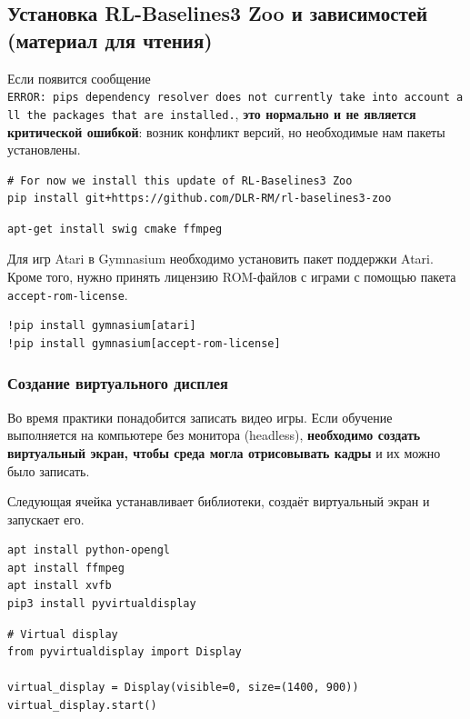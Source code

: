 \documentclass[11pt,a4paper]{article}
\begin{document}
\subsection{Установка RL-Baselines3 Zoo и зависимостей (материал для чтения)}\label{install-rl-baselines3-zoo-and-its-dependencies-reading}

Если появится сообщение \texttt{ERROR:\ pip\textquotesingle{}s\ dependency\ resolver\ does\ not\ currently\ take\ into\ account\ all\ the\ packages\ that\ are\ installed.}, \textbf{это нормально и не является критической ошибкой}: возник конфликт версий, но необходимые нам пакеты установлены.

\begin{lstlisting}
# For now we install this update of RL-Baselines3 Zoo
pip install git+https://github.com/DLR-RM/rl-baselines3-zoo
\end{lstlisting}

\begin{lstlisting}
apt-get install swig cmake ffmpeg
\end{lstlisting}

Для игр Atari в Gymnasium необходимо установить пакет поддержки Atari. Кроме того, нужно принять лицензию ROM-файлов с играми с помощью пакета \texttt{accept-rom-license}.

\begin{lstlisting}
!pip install gymnasium[atari]
!pip install gymnasium[accept-rom-license]
\end{lstlisting}

\subsubsection{Создание виртуального дисплея}\label{create-a-virtual-display}

Во время практики понадобится записать видео игры. Если обучение выполняется на компьютере без монитора (headless), \textbf{необходимо создать виртуальный экран, чтобы среда могла отрисовывать кадры} и их можно было записать.

Следующая ячейка устанавливает библиотеки, создаёт виртуальный экран и запускает его.

\begin{lstlisting}
apt install python-opengl
apt install ffmpeg
apt install xvfb
pip3 install pyvirtualdisplay
\end{lstlisting}

\begin{lstlisting}
# Virtual display
from pyvirtualdisplay import Display

virtual_display = Display(visible=0, size=(1400, 900))
virtual_display.start()
\end{lstlisting}
\end{document}
